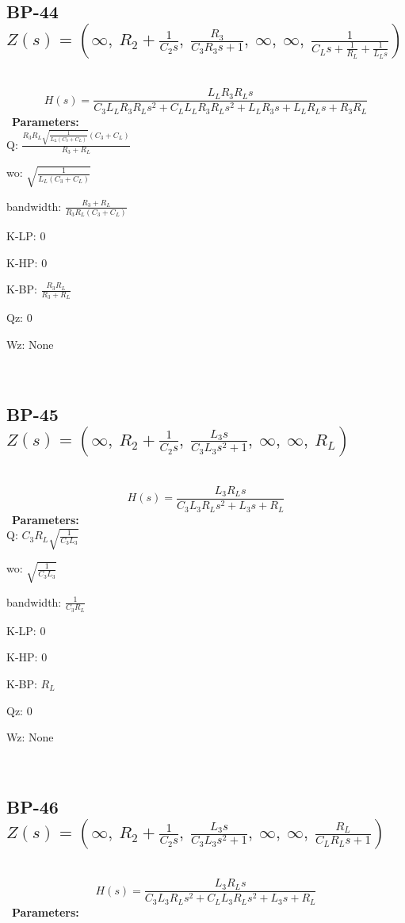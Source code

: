 \documentclass{article}
\begin{document}
\ 

\subsection{BP-44 $Z(s) = \left( \infty, \  R_{2} + \frac{1}{C_{2} s}, \  \frac{R_{3}}{C_{3} R_{3} s + 1}, \  \infty, \  \infty, \  \frac{1}{C_{L} s + \frac{1}{R_{L}} + \frac{1}{L_{L} s}}\right)$ } \ 
\textbf{\[H(s) = \frac{L_{L} R_{3} R_{L} s}{C_{3} L_{L} R_{3} R_{L} s^{2} + C_{L} L_{L} R_{3} R_{L} s^{2} + L_{L} R_{3} s + L_{L} R_{L} s + R_{3} R_{L}}\] } \ 
\textbf{Parameters:}\\ 

Q: $\frac{R_{3} R_{L} \sqrt{\frac{1}{L_{L} \left(C_{3} + C_{L}\right)}} \left(C_{3} + C_{L}\right)}{R_{3} + R_{L}}$\ 

wo: $\sqrt{\frac{1}{L_{L} \left(C_{3} + C_{L}\right)}}$\ 

bandwidth: $\frac{R_{3} + R_{L}}{R_{3} R_{L} \left(C_{3} + C_{L}\right)}$\ 

K-LP: $0$\ 

K-HP: $0$\ 

K-BP: $\frac{R_{3} R_{L}}{R_{3} + R_{L}}$\ 

Qz: $0$\ 

Wz: $\text{None}$\ 

\ 

\subsection{BP-45 $Z(s) = \left( \infty, \  R_{2} + \frac{1}{C_{2} s}, \  \frac{L_{3} s}{C_{3} L_{3} s^{2} + 1}, \  \infty, \  \infty, \  R_{L}\right)$ } \ 
\textbf{\[H(s) = \frac{L_{3} R_{L} s}{C_{3} L_{3} R_{L} s^{2} + L_{3} s + R_{L}}\] } \ 
\textbf{Parameters:}\\ 

Q: $C_{3} R_{L} \sqrt{\frac{1}{C_{3} L_{3}}}$\ 

wo: $\sqrt{\frac{1}{C_{3} L_{3}}}$\ 

bandwidth: $\frac{1}{C_{3} R_{L}}$\ 

K-LP: $0$\ 

K-HP: $0$\ 

K-BP: $R_{L}$\ 

Qz: $0$\ 

Wz: $\text{None}$\ 

\ 

\subsection{BP-46 $Z(s) = \left( \infty, \  R_{2} + \frac{1}{C_{2} s}, \  \frac{L_{3} s}{C_{3} L_{3} s^{2} + 1}, \  \infty, \  \infty, \  \frac{R_{L}}{C_{L} R_{L} s + 1}\right)$ } \ 
\textbf{\[H(s) = \frac{L_{3} R_{L} s}{C_{3} L_{3} R_{L} s^{2} + C_{L} L_{3} R_{L} s^{2} + L_{3} s + R_{L}}\] } \ 
\textbf{Parameters:}\\ 
\end{document}
